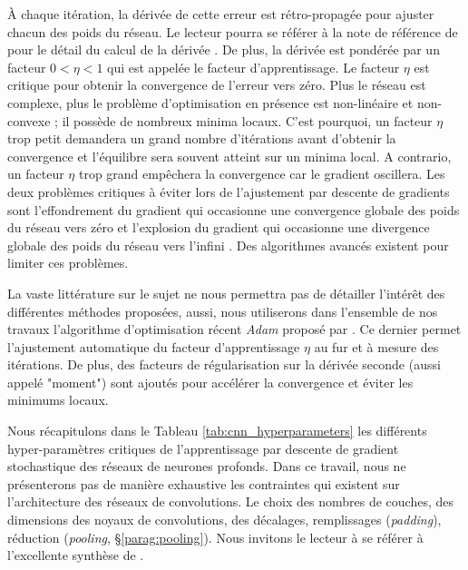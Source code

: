 À chaque itération, la dérivée de cette erreur est rétro-propagée pour ajuster chacun des poids du réseau.
Le lecteur pourra se référer à la note de référence de \citeauthor{sadowski_notes_2016} pour le détail du calcul de la dérivée \cite{sadowski_notes_2016}.
De plus, la dérivée est pondérée par un facteur $0 < \eta < 1$ qui est appelée le facteur d'apprentissage.
Le facteur $\eta$ est critique pour obtenir la convergence de l'erreur vers zéro.
Plus le réseau est complexe, plus le problème d'optimisation en présence est non-linéaire et non-convexe ; il possède de nombreux minima locaux.
C'est pourquoi, un facteur $\eta$ trop petit demandera un grand nombre d'itérations avant d'obtenir la convergence et l'équilibre sera souvent atteint sur un minima local.
A contrario, un facteur $\eta$ trop grand empêchera la convergence car le gradient oscillera.
Les deux problèmes critiques à éviter lors de l'ajustement par descente de gradients sont l'effondrement du gradient qui occasionne une convergence globale des poids du réseau vers zéro et l'explosion du gradient qui occasionne une divergence globale des poids du réseau vers l'infini \cite{bengio_learning_1994, hochreiter_gradient_2001}.
Des algorithmes avancés existent pour limiter ces problèmes.

La vaste littérature sur le sujet ne nous permettra pas de détailler l'intérêt des différentes méthodes proposées, aussi, nous utiliserons dans l'ensemble de nos travaux l'algorithme d'optimisation récent \textit{Adam} proposé par \citeauthor{kingma_adam_2014} \cite{kingma_adam_2014}.
Ce dernier permet l'ajustement automatique du facteur d'apprentissage  $\eta$ au fur et à mesure des itérations.
De plus, des facteurs de régularisation sur la dérivée seconde (aussi appelé "moment") sont ajoutés pour accélérer la convergence et éviter les minimums locaux.

Nous récapitulons dans le Tableau \ref{tab:cnn_hyperparameters} les différents hyper-paramètres critiques de l'apprentissage par descente de gradient stochastique des réseaux de neurones profonds. Dans ce travail, nous ne présenterons pas de manière exhaustive les contraintes qui existent sur l'architecture des réseaux de convolutions. Le choix des nombres de couches, des dimensions des noyaux de convolutions, des décalages, remplissages (\textit{padding}), réduction (\textit{pooling}, §\ref{parag:pooling}). Nous invitons le lecteur à se référer à l'excellente synthèse de \citeauthor{dumoulin_guide_2016} \cite{dumoulin_guide_2016}.

